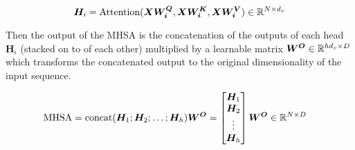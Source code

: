 \documentclass[../main.tex]{subfiles}
\begin{document}
\begin{equation}
	\bm{H}_i = \text{Attention}(\bm{X}\bm{W^Q_i}, \bm{X}\bm{W^K_i}, \bm{X}\bm{W^V_i}) \in \mathbb{R}^{N \times d_v}
\end{equation}

Then the output of the MHSA is the concatenation of the outputs of each head $\bm{H}_i$ (stacked on to of each other) multiplied by a learnable matrix $\bm{W^O} \in \mathbb{R}^{hd_v \times D}$ which transforms the concatenated output to the original dimensionality of the input sequence.

\begin{align*}
	\text{MHSA} &= \text{concat}(\bm{H}_1; \bm{H}_2; \dots; \bm{H}_h)\bm{W^O} 
	= \begin{bmatrix}
		\bm{H}_1 \\
		\bm{H}_2 \\
		\vdots \\
		\bm{H}_h
	\end{bmatrix} \bm{W^O} \in \mathbb{R}^{N \times D}
\end{align*}




\ifSubfilesClassLoaded{%
    \printbibliography{}
}{} 
\end{document}
